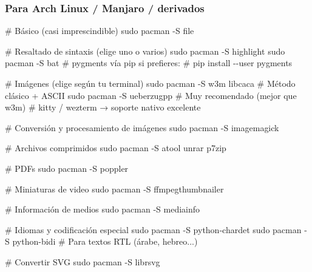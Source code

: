 \documentclass[
  doc,
  floatsintext,
  longtable,
  a4paper,
  nolmodern,
  notxfonts,
  notimes,
  12pt,
  colorlinks=true,linkcolor=blue,citecolor=blue,urlcolor=blue]{apa7}
\newenvironment{Shaded}{\begin{snugshade}}{\end{snugshade}}
\newcommand{\AttributeTok}[1]{\textcolor[rgb]{0.40,0.45,0.13}{#1}}
\newcommand{\CommentTok}[1]{\textcolor[rgb]{0.37,0.37,0.37}{#1}}
\newcommand{\FunctionTok}[1]{\textcolor[rgb]{0.28,0.35,0.67}{#1}}
\newcommand{\NormalTok}[1]{\textcolor[rgb]{0.00,0.23,0.31}{#1}}
\begin{document}
\subsubsection{Para Arch Linux / Manjaro /
derivados}\label{para-arch-linux-manjaro-derivados}

\begin{Shaded}
\begin{Highlighting}[]
\CommentTok{\# Básico (casi imprescindible)}
\FunctionTok{sudo}\NormalTok{ pacman }\AttributeTok{{-}S}\NormalTok{ file}

\CommentTok{\# Resaltado de sintaxis (elige uno o varios)}
\FunctionTok{sudo}\NormalTok{ pacman }\AttributeTok{{-}S}\NormalTok{ highlight}
\FunctionTok{sudo}\NormalTok{ pacman }\AttributeTok{{-}S}\NormalTok{ bat}
\CommentTok{\# pygments vía pip si prefieres:}
\CommentTok{\# pip install {-}{-}user pygments}

\CommentTok{\# Imágenes (elige según tu terminal)}
\FunctionTok{sudo}\NormalTok{ pacman }\AttributeTok{{-}S}\NormalTok{ w3m libcaca             }\CommentTok{\# Método clásico + ASCII}
\FunctionTok{sudo}\NormalTok{ pacman }\AttributeTok{{-}S}\NormalTok{ ueberzugpp              }\CommentTok{\# Muy recomendado (mejor que w3m)}
\CommentTok{\# kitty / wezterm → soporte nativo excelente}

\CommentTok{\# Conversión y procesamiento de imágenes}
\FunctionTok{sudo}\NormalTok{ pacman }\AttributeTok{{-}S}\NormalTok{ imagemagick}

\CommentTok{\# Archivos comprimidos}
\FunctionTok{sudo}\NormalTok{ pacman }\AttributeTok{{-}S}\NormalTok{ atool unrar p7zip}

\CommentTok{\# PDFs}
\FunctionTok{sudo}\NormalTok{ pacman }\AttributeTok{{-}S}\NormalTok{ poppler}

\CommentTok{\# Miniaturas de video}
\FunctionTok{sudo}\NormalTok{ pacman }\AttributeTok{{-}S}\NormalTok{ ffmpegthumbnailer}

\CommentTok{\# Información de medios}
\FunctionTok{sudo}\NormalTok{ pacman }\AttributeTok{{-}S}\NormalTok{ mediainfo}

\CommentTok{\# Idiomas y codificación especial}
\FunctionTok{sudo}\NormalTok{ pacman }\AttributeTok{{-}S}\NormalTok{ python{-}chardet}
\FunctionTok{sudo}\NormalTok{ pacman }\AttributeTok{{-}S}\NormalTok{ python{-}bidi             }\CommentTok{\# Para textos RTL (árabe, hebreo...)}

\CommentTok{\# Convertir SVG}
\FunctionTok{sudo}\NormalTok{ pacman }\AttributeTok{{-}S}\NormalTok{ librsvg}
\end{Highlighting}
\end{Shaded}
\end{document}
